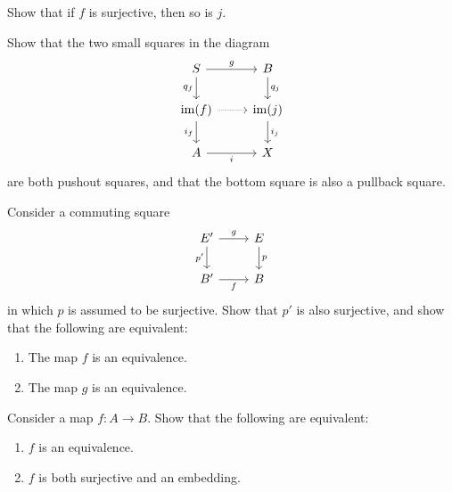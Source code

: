 \begin{exercises}
  \begin{subexenum}
  \item Show that if $f$ is surjective, then so is $j$.
  \item Show that the two small squares in the diagram 
    \begin{equation*}
      \begin{tikzcd}
        S \arrow[r,"g"] \arrow[d,swap,"q_f"] & B \arrow[d,"q_j"] \\
        \im(f) \arrow[r,densely dotted] \arrow[d,swap,"i_f"] & \im(j) \arrow[d,"i_j"] \\
        A \arrow[r,swap,"i"] & X
      \end{tikzcd}
    \end{equation*}
    are both pushout squares, and that the bottom square is also a pullback square.
  \end{subexenum}
  \exercise Consider a commuting square
  \begin{equation*}
    \begin{tikzcd}
      E' \arrow[d,swap,"{p'}"] \arrow[r,"g"] & E \arrow[d,"p"] \\
      B' \arrow[r,swap,"f"] & B
    \end{tikzcd}
  \end{equation*}
  in which $p$ is assumed to be surjective. Show that $p'$ is also surjective, and show that the following are equivalent:
  \begin{enumerate}
  \item The map $f$ is an equivalence.
  \item The map $g$ is an equivalence.
  \end{enumerate}
  \exercise
  Consider a map $f:A\to B$. Show that the following are equivalent:
  \begin{enumerate}
  \item $f$ is an equivalence.
  \item $f$ is both surjective and an embedding.
  \end{enumerate}
\end{exercises}

\endinput

\begin{thm}
Consider a commuting triangle
\begin{equation*}
\begin{tikzcd}[column sep=small]
A \arrow[rr,"i"] \arrow[dr,swap,"f"] & & B \arrow[dl,"m"] \\
& X
\end{tikzcd}
\end{equation*}
with $I:f\htpy m\circ i$, where $m$ is an embedding. The following are equivalent:
\begin{enumerate}
\item $m$ satisfies the universal property of the image of $f$.
\item for each $x:X$, the proposition $\fib{m}{x}$ satisfies the universal property of the propositional truncation of $\fib{f}{x}$.
\end{enumerate}
\end{thm}
